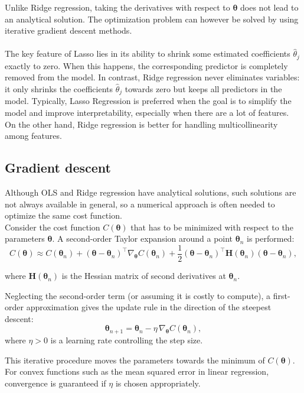 \documentclass[%
 reprint,            %
 amsmath,amssymb,
 aps,
]{revtex4-2}
\begin{document}
Unlike Ridge regression, taking the derivatives with respect to $\boldsymbol{\theta}$ does not lead to an analytical solution. 
The optimization problem can however be solved by using iterative gradient descent methods.\\ \\
The key feature of Lasso lies in its ability to shrink some estimated coefficients $\hat{\theta}_j$ exactly to zero. 
When this happens, the corresponding predictor is completely removed from the model.  
In contrast, Ridge regression never eliminates variables: it only shrinks the coefficients $\hat{\theta}_j$ towards zero but keeps all predictors in the model.
Typically, Lasso Regression is preferred when the goal is to simplify the model and improve interpretability, especially when there are a lot of features. On the other hand, Ridge regression is better for handling multicollinearity among features. 


\subsection{Gradient descent}

Although OLS and Ridge regression have analytical solutions, such solutions are not always available in general, so a numerical approach is often needed to optimize the same cost function.\\

Consider the cost function $C(\boldsymbol{\theta})$ that has to be minimized with respect to the parameters $\boldsymbol{\theta}$.  
A second-order Taylor expansion around a point $\boldsymbol{\theta}_n$ is performed:
$$
C(\boldsymbol{\theta}) \approx C(\boldsymbol{\theta}_n) + (\boldsymbol{\theta}-\boldsymbol{\theta}_n)^\top \nabla_{\boldsymbol{\theta}} C(\boldsymbol{\theta}_n) 
+ \frac{1}{2} (\boldsymbol{\theta}-\boldsymbol{\theta}_n)^\top \mathbf{H}(\boldsymbol{\theta}_n) (\boldsymbol{\theta}-\boldsymbol{\theta}_n),
$$

where $\mathbf{H}(\boldsymbol{\theta}_n)$ is the Hessian matrix of second derivatives at $\boldsymbol{\theta}_n$.

Neglecting the second-order term (or assuming it is costly to compute), a first-order approximation gives the update rule in the direction of the steepest descent:
\[
\boldsymbol{\theta}_{n+1} = \boldsymbol{\theta}_n - \eta \, \nabla_{\boldsymbol{\theta}} C(\boldsymbol{\theta}_n),
\]
where $\eta > 0$ is a learning rate controlling the step size.  

This iterative procedure moves the parameters towards the minimum of $C(\boldsymbol{\theta})$. For convex functions such as the mean squared error in linear regression, convergence is guaranteed if $\eta$ is chosen appropriately.
\end{document}
